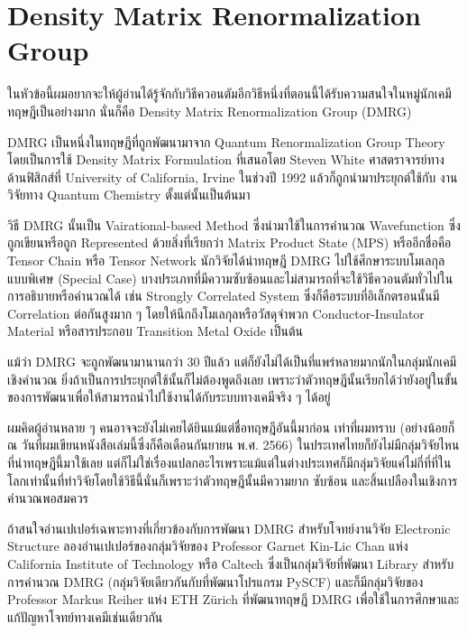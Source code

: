\section{Density Matrix Renormalization Group}

ในหัวข้อนี้ผมอยากจะให้ผู้อ่านได้รู้จักกับวิธีควอนตัมอีกวิธีหนึ่งที่ตอนนี้ได้รับความสนใจในหมู่นักเคมีทฤษฎีเป็นอย่างมาก นั่นก็คือ Density Matrix
Renormalization Group (DMRG)

DMRG เป็นหนึ่งในทฤษฎีที่ถูกพัฒนามาจาก Quantum Renormalization Group Theory โดยเป็นการใช้ Density Matrix Formulation
ที่เสนอโดย Steven White ศาสตราจารย์ทางด้านฟิสิกส์ที่ University of California, Irvine ในช่วงปี 1992 แล้วก็ถูกนำมาประยุกต์ใช้กับ%
งานวิจัยทาง Quantum Chemistry ตั้งแต่นั้นเป็นต้นมา

วิธี DMRG นั้นเป็น Vairational-based Method ซึ่งนำมาใช้ในการคำนวณ Wavefunction ซึ่งถูกเขียนหรือถูก Represented ด้วยสิ่งที่เรียกว่า
Matrix Product State (MPS) หรืออีกชื่อคือ Tensor Chain หรือ Tensor Network นักวิจัยได้นำทฤษฎี DMRG ไปใช้ศึกษาระบบโมเลกุลแบบพิเศษ
(Special Case) บางประเภทที่มีความซับซ้อนและไม่สามารถที่จะใช้วิธีควอนตัมทั่วไปในการอธิบายหรือคำนวณได้ เช่น Strongly Correlated
System ซึ่งก็คือระบบที่อิเล็กตรอนนั้นมี Correlation ต่อกันสูงมาก ๆ โดยให้นึกถึงโมเลกุลหรือวัสดุจำพวก Conductor-Insulator Material
หรือสารประกอบ Transition Metal Oxide เป็นต้น

แม้ว่า DMRG จะถูกพัฒนามานานกว่า 30 ปีแล้ว แต่ก็ยังไม่ได้เป็นที่แพร่หลายมากนักในกลุ่มนักเคมีเชิงคำนวณ ยิ่งถ้าเป็นการประยุกต์ใช้นั้นก็ไม่ต้องพูดถึงเลย
เพราะว่าตัวทฤษฎีนั้นเรียกได้ว่ายังอยู่ในขั้นของการพัฒนาเพื่อให้สามารถนำไปใช้งานได้กับระบบทางเคมีจริง ๆ ได้อยู่ 

ผมคิดผู้อ่านหลาย ๆ คนอาจจะยังไม่เคยได้ยินแม้แต่ชื่อทฤษฎีอันนี้มาก่อน เท่าที่ผมทราบ (อย่างน้อยก็ ณ วันที่ผมเขียนหนังสือเล่มนี้ซึ่งก็คือเดือนกันยายน
พ.ศ. 2566) ในประเทศไทยก็ยังไม่มีกลุ่มวิจัยไหนที่นำทฤษฎีนี้มาใช้เลย แต่ก็ไม่ใช่เรื่องแปลกอะไรเพราะแม้แต่ในต่างประเทศก็มีกลุ่มวิจัยแค่ไม่กี่ที่ที่ใน%
โลกเท่านั้นที่ทำวิจัยโดยใช้วิธีนี้นั่นก็เพราะว่าตัวทฤษฎีนั้นมีความยาก ซับซ้อน และสิ้นเปลืองในเชิงการคำนวณพอสมควร

ถ้าสนใจอ่านเปเปอร์เฉพาะทางที่เกี่ยวข้องกับการพัฒนา DMRG สำหรับโจทย์งานวิจัย Electronic Structure ลองอ่านเปเปอร์ของกลุ่มวิจัยของ
Professor Garnet Kin-Lic Chan แห่ง California Institute of Technology หรือ Caltech ซึ่งเป็นกลุ่มวิจัยที่พัฒนา Library 
สำหรับการคำนวณ DMRG (กลุ่มวิจัยเดียวกันกับที่พัฒนาโปรแกรม PySCF) และก็มีกลุ่มวิจัยของ Professor Markus Reiher แห่ง ETH Zürich 
ที่พัฒนาทฤษฎี DMRG เพื่อใช้ในการศึกษาและแก้ปัญหาโจทย์ทางเคมีเช่นเดียวกัน

